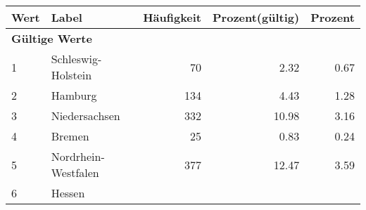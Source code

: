      \begin{longtable}{lXrrr}
     \toprule
     \textbf{Wert} & \textbf{Label} & \textbf{Häufigkeit} & \textbf{Prozent(gültig)} & \textbf{Prozent} \\
     \endhead
     \midrule
     \multicolumn{5}{l}{\textbf{Gültige Werte}}\\

     1 &
     \multicolumn{1}{X}{ Schleswig-Holstein   } &


       \num{70} &
       \num[round-mode=places,round-precision=2]{2.32} &
         \num[round-mode=places,round-precision=2]{0.67} \\

     2 &
     \multicolumn{1}{X}{ Hamburg   } &


       \num{134} &
       \num[round-mode=places,round-precision=2]{4.43} &
         \num[round-mode=places,round-precision=2]{1.28} \\

     3 &
     \multicolumn{1}{X}{ Niedersachsen   } &


       \num{332} &
       \num[round-mode=places,round-precision=2]{10.98} &
         \num[round-mode=places,round-precision=2]{3.16} \\

     4 &
     \multicolumn{1}{X}{ Bremen   } &


       \num{25} &
       \num[round-mode=places,round-precision=2]{0.83} &
         \num[round-mode=places,round-precision=2]{0.24} \\

     5 &
     \multicolumn{1}{X}{ Nordrhein-Westfalen   } &


       \num{377} &
       \num[round-mode=places,round-precision=2]{12.47} &
         \num[round-mode=places,round-precision=2]{3.59} \\

     6 &
     \multicolumn{1}{X}{ Hessen   } &



\end{longtable}
